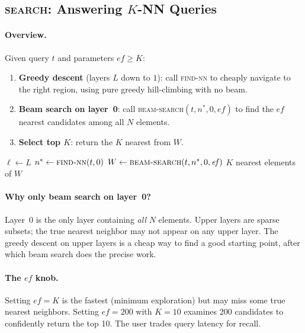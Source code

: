 \documentclass[11pt]{article}
\newcommand{\ef}{\mathit{ef}}
\theoremstyle{definition}
\begin{document}
\subsection{\textsc{search}: Answering $K$-NN Queries}
\label{sec:search}

\paragraph{Overview.} Given query $t$ and parameters $\ef \geq K$:
\begin{enumerate}
  \item \textbf{Greedy descent} (layers $L$ down to $1$): call \textsc{find-nn} to cheaply navigate to the right region, using pure greedy hill-climbing with no beam.
  \item \textbf{Beam search on layer~0}: call \textsc{beam-search}$(t, n^*, 0, \ef)$ to find the $\ef$ nearest candidates among all $N$ elements.
  \item \textbf{Select top $K$}: return the $K$ nearest from $W$.
\end{enumerate}

\begin{algorithm}
\caption{\textsc{search} --- $K$-nearest neighbor query}
\begin{algorithmic}[1]
\Function{search}{$t, \ef, K$}
  \State $\ell \gets L$ 
  \State $n^* \gets \Call{find-nn}{t, 0}$ 
  \State $W \gets \Call{beam-search}{t, n^*, 0, \ef}$
  \State \Return $K$ nearest elements of $W$
\EndFunction
\end{algorithmic}
\end{algorithm}

\paragraph{Why only beam search on layer~0?} Layer~0 is the only layer containing \emph{all} $N$ elements. Upper layers are sparse subsets; the true nearest neighbor may not appear on any upper layer. The greedy descent on upper layers is a cheap way to find a good starting point, after which beam search does the precise work.

\paragraph{The $\ef$ knob.} Setting $\ef = K$ is the fastest (minimum exploration) but may miss some true nearest neighbors. Setting $\ef = 200$ with $K = 10$ examines 200 candidates to confidently return the top 10. The user trades query latency for recall.
\end{document}
